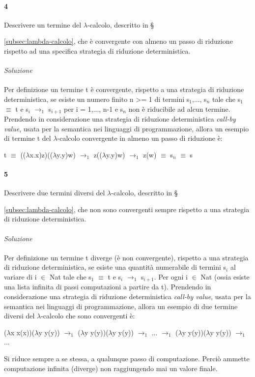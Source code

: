 \documentclass[10pt,a4paper, italian]{book}
\begin{document}
\paragraph{4}
Descrivere un termine del $\lambda$-calcolo, descritto in \S{\ref{subsec:lambda-calcolo},  che \`e convergente con almeno un passo di riduzione rispetto ad una specifica strategia di riduzione deterministica.\\\\
\textit{Soluzione}\\\\
Per definizione un termine t \`e convergente, rispetto a una strategia di
riduzione deterministica, se esiste un numero finito n >= 1 di termini s$_1$,..., s$_n$ tale che s$_1$ $\equiv$ t e s$_i$ $\rightarrow_1$ s$_{i + 1}$ per i = 1,..., n-1 e s$_n$ non \`e riducibile ad alcun termine.\\
Prendendo in considerazione una strategia di riduzione deterministica \textit{call-by value}, usata per la semantica nei linguaggi di programmazione, allora un esempio di termine t del $\lambda$-calcolo convergente in almeno un passo di riduzione \`e:
\begin{center}t $\equiv$ (($\lambda$x.x)z)(($\lambda$y.y)w) $\rightarrow_1$ z(($\lambda$y.y)w) $\rightarrow_1$ z(w) $\equiv$ s$_n$ $\equiv$ s\end{center}
\paragraph{5} 
Descrivere due termini diversi del $\lambda$-calcolo, descritto in \S{\ref{subsec:lambda-calcolo}, che non sono convergenti sempre rispetto a una strategia di riduzione deterministica.\\\\
\textit{Soluzione}\\\\
Per definizione un termine t diverge (\`e non convergente), rispetto a una strategia
di riduzione deterministica, se esiste una quantit\`a numerabile di termini s$_i$ al variare di i $\in$ Nat tale che s$_1$ $\equiv$ t e s$_i$ $\rightarrow_1$ s$_{i+1}$. Per ogni i $\in$ Nat (ossia esiste una lista infinita di passi computazioni a partire da t).
Prendendo in considerazione una strategia di riduzione deterministica \textit{call-by value}, usata per la semantica nei linguaggi di programmazione, allora un esempio di due termine diversi del $\lambda$-calcolo che sono convergenti \`e:
\begin{center}($\lambda$x x(x))($\lambda$y y(y)) $\rightarrow_1$ ($\lambda$y y(y))($\lambda$y y(y))  $\rightarrow_1$ ... $\rightarrow_1$ ($\lambda$y y(y))($\lambda$y y(y)) $\rightarrow_1$ ... \end{center}
Si riduce sempre a se stessa, a qualunque passo di computazione. Perci\`o ammette computazione infinita (diverge) non raggiungendo mai un valore finale.
}}
\end{document}
